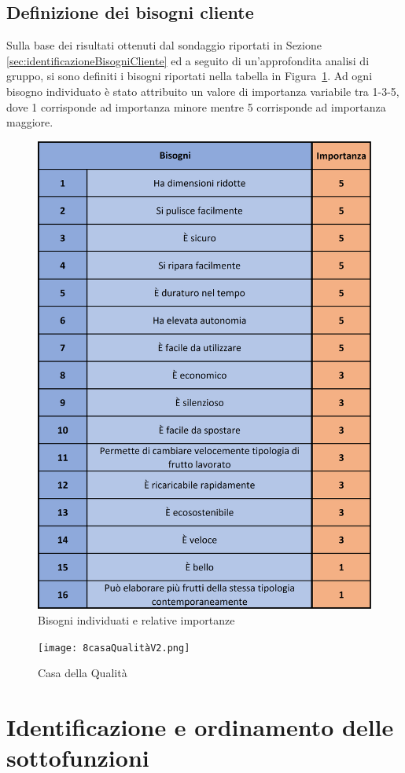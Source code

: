 \documentclass[12pt,a4paper,twoside]{report}  %
\begin{document}
\subsection{Definizione dei bisogni cliente}
Sulla base dei risultati ottenuti dal sondaggio riportati in Sezione \autoref{sec:identificazioneBisogniCliente} ed a seguito di un'approfondita analisi di gruppo, si sono definiti i bisogni riportati nella tabella in Figura~\ref{fig:bisogni}. Ad ogni bisogno individuato è stato attribuito un valore di importanza variabile tra 1-3-5, dove 1 corrisponde ad importanza minore mentre 5 corrisponde ad importanza maggiore.
\begin{figure}[H] %
    \centering
    \includegraphics[width=0.65\linewidth]{1bisogni.png}
    \caption{Bisogni individuati e relative importanze}
    \label{fig:bisogni}
\end{figure}

\newpage

\begin{landscape}
\begin{figure}
    \centering
    \texttt{[image: 8casaQualitàV2.png]}
    \caption{Casa della Qualità}
    \label{fig:casaQualità}
\end{figure}
\end{landscape}

\newpage


\section{Identificazione e ordinamento delle sottofunzioni}
\end{document}

